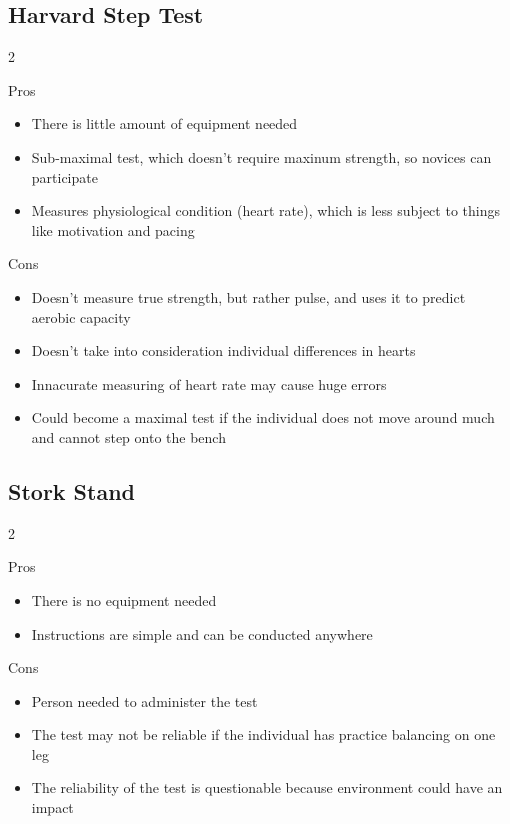 \documentclass[index]{subfiles}
\begin{document}
\def\columntwo#1#2{
    \begin{paracol}{2}
        \begin{center}Pros\end{center}
        \begin{itemize}
            #1
        \end{itemize}

        \switchcolumn

        \begin{center}Cons\end{center}
        \begin{itemize}
            #2
        \end{itemize}

    \end{paracol}
}

\subsection*{Harvard Step Test}

\columntwo{
    \item There is little amount of equipment needed
    \item Sub-maximal test, which doesn't require maxinum strength, so novices can participate
    \item Measures physiological condition (heart rate), which is less subject to things like motivation and pacing
}{
    \item Doesn't measure true strength, but rather pulse, and uses it to predict aerobic capacity
    \item Doesn't take into consideration individual differences in hearts
    \item Innacurate measuring of heart rate may cause huge errors
    \item Could become a maximal test if the individual does not move around much and cannot step onto the bench
}

\subsection*{Stork Stand}

\columntwo {
    \item There is no equipment needed
    \item Instructions are simple and can be conducted anywhere
}{
    \item Person needed to administer the test
    \item The test may not be reliable if the individual has practice balancing on one leg
    \item The reliability of the test is questionable because environment could have an impact
}
\end{document}
